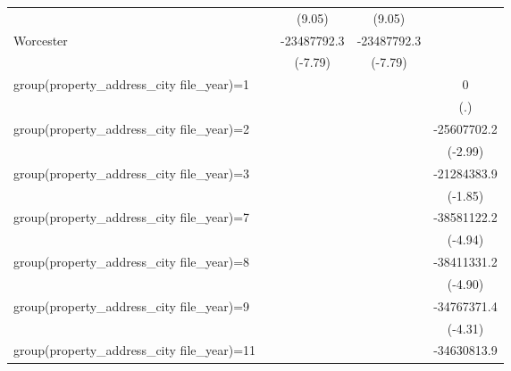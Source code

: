 {\begin{tabular}{l*{4}{c}}
                    &                     &      (9.05)         &      (9.05)         &                     \\
\addlinespace
Worcester           &                     & -23487792.3\sym{***}& -23487792.3\sym{***}&                     \\
                    &                     &     (-7.79)         &     (-7.79)         &                     \\
\addlinespace
group(property\_address\_city file\_year)=1&                     &                     &                     &           0         \\
                    &                     &                     &                     &         (.)         \\
\addlinespace
group(property\_address\_city file\_year)=2&                     &                     &                     & -25607702.2\sym{**} \\
                    &                     &                     &                     &     (-2.99)         \\
\addlinespace
group(property\_address\_city file\_year)=3&                     &                     &                     & -21284383.9         \\
                    &                     &                     &                     &     (-1.85)         \\
\addlinespace
group(property\_address\_city file\_year)=7&                     &                     &                     & -38581122.2\sym{***}\\
                    &                     &                     &                     &     (-4.94)         \\
\addlinespace
group(property\_address\_city file\_year)=8&                     &                     &                     & -38411331.2\sym{***}\\
                    &                     &                     &                     &     (-4.90)         \\
\addlinespace
group(property\_address\_city file\_year)=9&                     &                     &                     & -34767371.4\sym{***}\\
                    &                     &                     &                     &     (-4.31)         \\
\addlinespace
group(property\_address\_city file\_year)=11&                     &                     &                     & -34630813.9\sym{***}\\

\end{tabular}}

